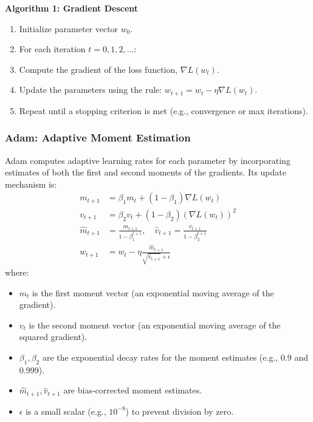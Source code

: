 \documentclass[20pt]{article}
\begin{document}
\textbf{Algorithm 1: Gradient Descent}
\begin{enumerate}
    \item Initialize parameter vector $w_0$.
    \item For each iteration $t = 0, 1, 2, \dots$:
    \item \quad Compute the gradient of the loss function, $\nabla L(w_t)$.
    \item \quad Update the parameters using the rule: $w_{t+1} = w_t - \eta \nabla L(w_t)$.
    \item Repeat until a stopping criterion is met (e.g., convergence or max iterations).
\end{enumerate}

\subsubsection{Adam: Adaptive Moment Estimation}
Adam \cite{Kingma2015Adam} computes adaptive learning rates for each parameter by incorporating estimates of both the first and second moments of the gradients. Its update mechanism is:
\begin{equation}\label{eq:adam-update}
\begin{aligned}
m_{t+1} &= \beta_1 m_t + (1-\beta_1) \nabla L(w_t) \\
v_{t+1} &= \beta_2 v_t + (1-\beta_2) (\nabla L(w_t))^2 \\
\hat{m}_{t+1} &= \frac{m_{t+1}}{1-\beta_1^{t+1}}, \quad
\hat{v}_{t+1} = \frac{v_{t+1}}{1-\beta_2^{t+1}} \\
w_{t+1} &= w_t - \eta \frac{\hat{m}_{t+1}}{\sqrt{\hat{v}_{t+1}} + \epsilon}
\end{aligned}
\end{equation}
where:
\begin{itemize}
    \item $m_t$ is the first moment vector (an exponential moving average of the gradient).
    \item $v_t$ is the second moment vector (an exponential moving average of the squared gradient).
    \item $\beta_1, \beta_2$ are the exponential decay rates for the moment estimates (e.g., 0.9 and 0.999).
    \item $\hat{m}_{t+1}, \hat{v}_{t+1}$ are bias-corrected moment estimates.
    \item $\epsilon$ is a small scalar (e.g., $10^{-8}$) to prevent division by zero.
\end{itemize}
\end{document}
